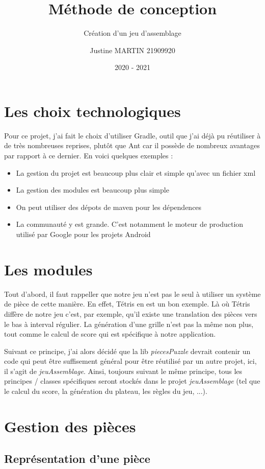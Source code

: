 \documentclass[report]{BetterDocument}
\title{Méthode de conception}
\subtitle{Création d'un jeu d'assemblage}
\author{Justine MARTIN 21909920}
\date{2020 - 2021}
\institute{Unicaen}
\begin{document}
	\pageDeGarde

	\section{Les choix technologiques}

		Pour ce projet, j'ai fait le choix d'utiliser Gradle, outil que j'ai déjà pu réutiliser à de très nombreuses reprises, plutôt que Ant car il possède de nombreux avantages par rapport à ce dernier. En voici quelques exemples :

		\begin{itemize}
			\item{La gestion du projet est beaucoup plus clair et simple qu'avec un fichier xml}
			\item{La gestion des modules est beaucoup plus simple}
			\item{On peut utiliser des dépots de maven pour les dépendences}
			\item{La communauté y est grande. C'est notamment le moteur de production utilisé par Google pour les projets Android}
		\end{itemize}

	\section{Les modules}

		Tout d'abord, il faut rappeller que notre jeu n'est pas le seul à utiliser un système de pièce de cette manière. En effet, Tétris en est un bon exemple. Là où Tétris diffère de notre jeu c'est, par exemple, qu'il existe une translation des pièces vers le bas à interval régulier. La génération d'une grille n'est pas la même non plus, tout comme le calcul de score qui est spécifique à notre application.

		Suivant ce principe, j'ai alors décidé que la lib \textit{piecesPuzzle} devrait contenir un code qui peut être suffisement général pour être réutilisé par un autre projet, ici, il s'agit de \textit{jeuAssemblage}. Ainsi, toujours suivant le même principe, tous les principes / classes spécifiques seront stockés dans le projet \textit{jeuAssemblage} (tel que le calcul du score, la génération du plateau, les règles du jeu, ...).

	\section{Gestion des pièces}

		\subsection{Représentation d'une pièce}
\end{document}
